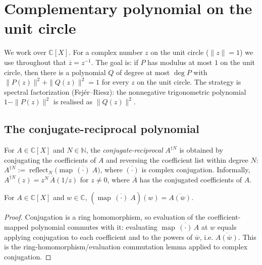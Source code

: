 


\section{Complementary polynomial on the unit circle}

We work over $\mathbb{C}[X]$. For a complex number $z$ on the unit circle
($\|z\| = 1$) we use throughout that $\overline{z} = z^{-1}$. The goal is: if
$P$ has modulus at most $1$ on the unit circle, then there is a polynomial $Q$
of degree at most $\deg P$ with $\|P(z)\|^2 + \|Q(z)\|^2 = 1$ for every $z$ on
the unit circle. The strategy is spectral factorization (Fejér--Riesz): the
nonnegative trigonometric polynomial $1 - \|P(z)\|^2$ is realised as $\|Q(z)\|^2$.

\subsection{The conjugate-reciprocal polynomial}

\begin{definition}
    \label{def:conj-recip}
    \leanok
    For $A \in \mathbb{C}[X]$ and $N \in \mathbb{N}$, the
    \emph{conjugate-reciprocal} $A^{\dagger N}$ is obtained by conjugating the
    coefficients of $A$ and reversing the coefficient list within degree $N$:
    $A^{\dagger N} := \operatorname{reflect}_N\bigl(\operatorname{map}\,
    \overline{(\cdot)}\; A\bigr)$, where $\overline{(\cdot)}$ is complex
    conjugation. Informally, $A^{\dagger N}(z) = z^{N}\,\overline{A}(1/z)$ for
    $z \neq 0$, where $\overline{A}$ has the conjugated coefficients of $A$.
\end{definition}

\begin{lemma}
    \label{lem:map-conj-eval}
    \leanok
    For $A \in \mathbb{C}[X]$ and $w \in \mathbb{C}$,
    $(\operatorname{map}\,\overline{(\cdot)}\;A)(w) = \overline{A(\overline{w})}$.
\end{lemma}
\begin{proof}
    Conjugation is a ring homomorphism, so evaluation of the coefficient-mapped
    polynomial commutes with it: evaluating $\operatorname{map}\,\overline{(\cdot)}\,A$
    at $w$ equals applying conjugation to each coefficient and to the powers of
    $\overline{w}$, i.e. $\overline{A(\overline{w})}$. This is the
    ring-homomorphism/evaluation commutation lemma applied to complex conjugation.
\end{proof}

